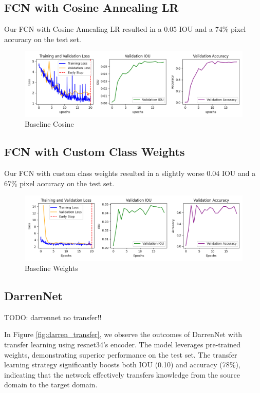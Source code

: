 \subsection{FCN with Cosine Annealing LR}

Our FCN with Cosine Annealing LR resulted in a 0.05 IOU and a 74\% pixel accuracy on the test set.


\begin{figure}[H]
	\centering
	\includegraphics[width=\textwidth]{plots/baseline_cosine}
	\caption{Baseline Cosine}
	\label{fig:baseline_cos}
\end{figure}

\subsection{FCN with Custom Class Weights}


Our FCN with custom class weights resulted in a slightly worse 0.04 IOU and a 67\% pixel accuracy on the test set.

\begin{figure}[H]
	\centering
	\includegraphics[width=\textwidth]{plots/baseline_weights}
	\caption{Baseline Weights}
	\label{fig:baseline_weights}
\end{figure}

\subsection{DarrenNet}

TODO: darrennet no transfer!!

In Figure \ref{fig:darren_transfer}, we observe the outcomes of DarrenNet with transfer learning using resnet34's encoder. The model leverages pre-trained weights, demonstrating superior performance on the test set. The transfer learning strategy significantly boosts both IOU (0.10) and accuracy (78\%), indicating that the network effectively transfers knowledge from the source domain to the target domain.


